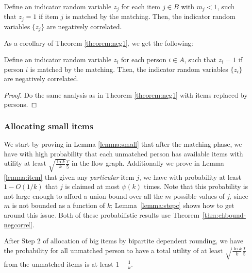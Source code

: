 \begin{theorem}
\label{theorem:neg1}
Define an indicator random variable $z_{j}$ for each item $j \in B$ with $m_{j} < 1$, such that $z_{j}=1$
 if item $j$ is matched by the matching. Then, the indicator random variables $\{z_{j}\}$ are negatively correlated.
 \end{theorem}



 As a corollary of Theorem \ref{theorem:neg1}, we get the following:
 \begin{corollary}
\label{cor:neg2}
Define an indicator random variable $z_{i}$ for each person $i \in A$, such that $z_{i}=1$
 if person $i$ is matched by the matching. Then, the indicator random variables $\{z_{i}\}$ are negatively correlated.
 \end{corollary}

\begin{proof}
Do the same analysis as in Theorem \ref{theorem:neg1} with items replaced by persons.
\end{proof}


\subsubsection{Allocating small items}
\label{subsec:alloc}

We start by proving in Lemma \ref{lemma:small} that after the matching phase, we have with high probability that
each unmatched person has available items with utility at least $\sqrt{\frac{\ln{k}}{k}}\frac{T}{5}$ in the flow graph. Additionally we prove in Lemma  \ref{lemma:item} that given any \emph{particular} item $j$, we have with probability at least $1 - O(1/k)$ that $j$ is claimed at most
$\psi(k)$ times. Note that this probability is not large enough to afford a union bound over all the $m$ possible values of $j$, since $m$ is not
bounded as a function of $k$; Lemma~\ref{lemma:stepc} shows how to get around this issue. Both of these probabilistic results use
Theorem~\ref{thm:chbound-negcorrel}.



\begin{lemma}
\label{lemma:small}
After Step 2 of  allocation of big items by bipartite dependent rounding, we have the probability for all unmatched person to have a total utility of at least
$\sqrt{\frac{\ln{k}}{k}}\frac{T}{5}$ from the unmatched items is at least $1-\frac{1}{k}$.
\end{lemma}


